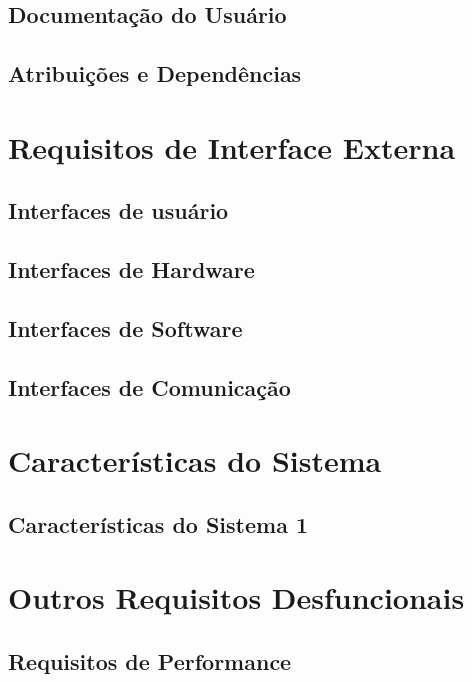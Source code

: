 \section{Documentação do Usuário}

\section{Atribuições e Dependências}

\newpage




\chapter{Requisitos de Interface Externa}
\label{External Interface Requirements}

\section{Interfaces de usuário}
\section{Interfaces de Hardware }
\section{Interfaces de Software }
\section{Interfaces de Comunicação}


\chapter{Características do Sistema}
\label{Características do Sistema}

\section{Características do Sistema 1}


\chapter{Outros Requisitos Desfuncionais}
\label{Outros Requisitos Desfuncionais}

\section{Requisitos de Performance}

